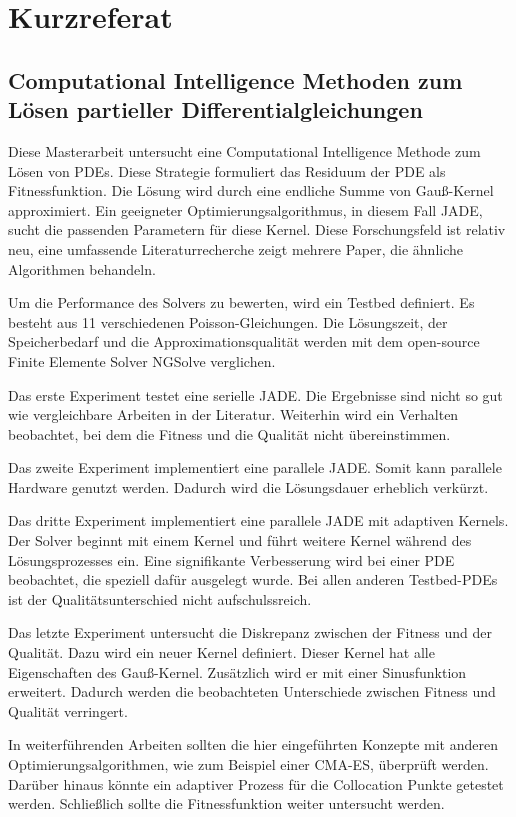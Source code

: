 \documentclass[./\jobname.tex]{subfiles}
\begin{document}
\setcounter{page}{2}
\chapter*{Kurzreferat}
\section*{Computational Intelligence Methoden zum Lösen partieller Differentialgleichungen}
%
Diese Masterarbeit untersucht eine Computational Intelligence Methode zum Lösen von PDEs. Diese Strategie formuliert das Residuum der PDE als Fitnessfunktion. Die Lösung wird durch eine endliche Summe von Gauß-Kernel approximiert. Ein geeigneter Optimierungsalgorithmus, in diesem Fall JADE, sucht die passenden Parametern für diese Kernel. Diese Forschungsfeld ist relativ neu, eine umfassende Literaturrecherche zeigt mehrere Paper, die ähnliche Algorithmen behandeln.

Um die Performance des Solvers zu bewerten, wird ein Testbed definiert. Es besteht aus 11 verschiedenen Poisson-Gleichungen. Die Lösungszeit, der Speicherbedarf und die Approximationsqualität werden mit dem open-source Finite Elemente Solver NGSolve verglichen. 

Das erste Experiment testet eine serielle JADE. Die Ergebnisse sind nicht so gut wie vergleichbare Arbeiten in der Literatur. Weiterhin wird ein Verhalten beobachtet, bei dem die Fitness und die Qualität nicht übereinstimmen.
 
Das zweite Experiment implementiert eine parallele JADE. Somit kann parallele Hardware genutzt werden. Dadurch wird die Lösungsdauer erheblich verkürzt. 

Das dritte Experiment implementiert eine parallele JADE mit adaptiven Kernels. Der Solver beginnt mit einem Kernel und führt weitere Kernel während des Lösungsprozesses ein. Eine signifikante Verbesserung wird bei einer PDE beobachtet, die speziell dafür ausgelegt wurde. Bei allen anderen Testbed-PDEs ist der Qualitätsunterschied nicht aufschulssreich.

Das letzte Experiment untersucht die Diskrepanz zwischen der Fitness und der Qualität. Dazu wird ein neuer Kernel definiert. Dieser Kernel hat alle Eigenschaften des Gauß-Kernel. Zusätzlich wird er mit einer Sinusfunktion erweitert. Dadurch werden die beobachteten Unterschiede zwischen Fitness und Qualität verringert. 

In weiterführenden Arbeiten sollten die hier eingeführten Konzepte mit anderen Optimierungsalgorithmen, wie zum Beispiel einer CMA-ES, überprüft werden. Darüber hinaus könnte ein adaptiver Prozess für die Collocation Punkte getestet werden. Schließlich sollte die Fitnessfunktion weiter untersucht werden.
%
\end{document}

